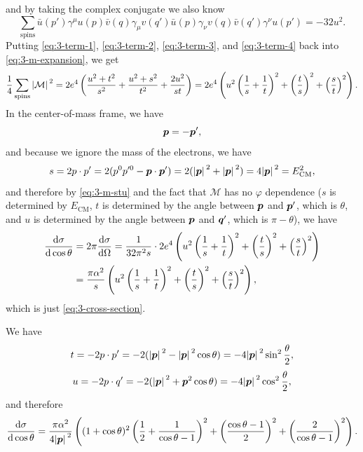\documentclass[hyperref, a4paper]{article}
\begin{document}
and by taking the complex conjugate we also know 
\begin{equation}
    \sum_\text{spins} \bar{u}(p') \gamma^\mu u(p) \bar{v}(q) \gamma_\mu v(q') \bar{u}(p) \gamma_\nu v(q) \bar{v}(q') \gamma^\nu u(p') = - 32 u^2.
    \label{eq:3-term-4}
\end{equation}
Putting \eqref{eq:3-term-1}, \eqref{eq:3-term-2}, \eqref{eq:3-term-3}, and \eqref{eq:3-term-4} back into \eqref{eq:3-m-expansion}, we get 
\begin{equation}
    \frac{1}{4} \sum_\text{spins} \abs*{\mathcal{M}}^2 = 2 e^4 \left( \frac{u^2 + t^2}{s^2} + \frac{u^2 + s^2}{t^2} + \frac{2 u^2}{st} \right) = 2 e^4 \left( u^2 \left( \frac{1}{s} + \frac{1}{t} \right)^2 + \left( \frac{t}{s} \right)^2 + \left( \frac{s}{t} \right)^2 \right).
    \label{eq:3-m-stu}
\end{equation}
In the center-of-mass frame, we have 
\[
    \vb*{p} = - \vb*{p}',
\]
and because we ignore the mass of the electrons, we have 
\[
    s = 2 p \cdot p' = 2 (p^0 p'^0 - \vb*{p} \cdot \vb*{p}') = 2 (\abs*{\vb*{p}}^2 + \abs*{\vb*{p}}^2) = 4 \abs*{\vb*{p}}^2 = E_\text{CM}^2,
\]
and therefore by \eqref{eq:3-m-stu} and the fact that $\mathcal{M}$ has no $\varphi$ dependence ($s$ is determined
by $E_\text{CM}$, $t$ is determined by the angle between $\vb*{p}$ and $\vb*{p}'$, which is $\theta$, and $u$ is 
determined by the angle between $\vb*{p}$ and $\vb*{q}'$, which is $\pi - \theta$), we have 
\begin{equation}
    \begin{aligned}
        \dv{\sigma}{\cos \theta} &= 2 \pi \dv{\sigma}{\Omega} = \frac{1}{32 \pi^2 s} \cdot 2 e^4 \left( u^2 \left( \frac{1}{s} + \frac{1}{t} \right)^2 + \left( \frac{t}{s} \right)^2 + \left( \frac{s}{t} \right)^2 \right) \\
        &= \frac{\pi \alpha^2}{s} \left( u^2 \left( \frac{1}{s} + \frac{1}{t} \right)^2 + \left( \frac{t}{s} \right)^2 + \left( \frac{s}{t} \right)^2 \right),
    \end{aligned}
\end{equation}
which is just \eqref{eq:3-cross-section}. 

We have 
\[
    t = -2 p \cdot p' = - 2 (\abs*{\vb*{p}}^2 - \abs*{\vb*{p}}^2 \cos \theta) = - 4 \abs*{\vb*{p}}^2 \sin^2 \frac{\theta}{2},
\]
\[
    u = - 2 p \cdot q' = - 2 (\abs*{\vb*{p}}^2 + \vb*{p}^2 \cos \theta) = - 4 \abs*{\vb*{p}}^2 \cos^2 \frac{\theta}{2},
\]
and therefore 
\begin{equation}
    \dv{\sigma}{\cos \theta} = \frac{\pi \alpha^2}{4 \abs*{\vb*{p}}^2} \left( (1 + \cos \theta)^2 \left( \frac{1}{2} + \frac{1}{\cos \theta - 1} \right)^2 + \left( \frac{\cos \theta - 1}{2} \right)^2 + \left( \frac{2}{\cos \theta - 1} \right)^2 \right).
    \label{eq:3-cross-section-cos}
\end{equation}
\end{document}
